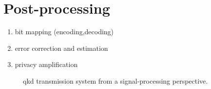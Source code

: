\section{Post-processing}

\begin{enumerate}
	\item bit mapping (encoding,decoding)
	\item error correction and estimation
	\item privacy amplification
\end{enumerate}




\begin{figure}[htb]
	\centering
	
	\caption{\Gls{qkd} transmission system from a signal-processing perspective.}
\end{figure}

\cite{Silberhorn2002} %
\cite{Fung2010} %

\cite{Leverrier2008} %
\cite{Elkouss2011} %





\cite{Bennett1995} %